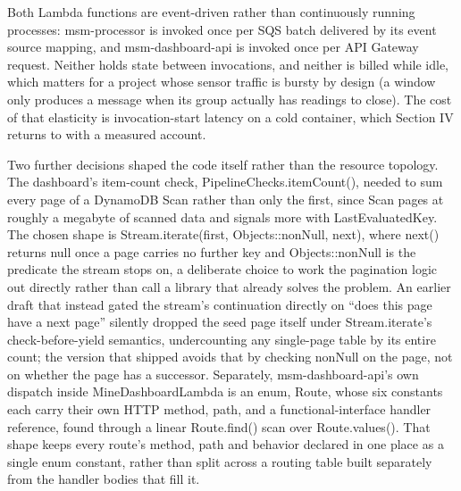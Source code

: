 \documentclass[conference]{IEEEtran}
\begin{document}
Both Lambda functions are event-driven rather than continuously running processes: msm-processor is invoked once per SQS batch delivered by its event source mapping, and msm-dashboard-api is invoked once per API Gateway request. Neither holds state between invocations, and neither is billed while idle, which matters for a project whose sensor traffic is bursty by design (a window only produces a message when its group actually has readings to close). The cost of that elasticity is invocation-start latency on a cold container, which Section IV returns to with a measured account.

Two further decisions shaped the code itself rather than the resource topology. The dashboard's item-count check, PipelineChecks.itemCount(), needed to sum every page of a DynamoDB Scan rather than only the first, since Scan pages at roughly a megabyte of scanned data and signals more with LastEvaluatedKey. The chosen shape is Stream.iterate(first, Objects::nonNull, next), where next() returns null once a page carries no further key and Objects::nonNull is the predicate the stream stops on, a deliberate choice to work the pagination logic out directly rather than call a library that already solves the problem. An earlier draft that instead gated the stream's continuation directly on ``does this page have a next page'' silently dropped the seed page itself under Stream.iterate's check-before-yield semantics, undercounting any single-page table by its entire count; the version that shipped avoids that by checking nonNull on the page, not on whether the page has a successor. Separately, msm-dashboard-api's own dispatch inside MineDashboardLambda is an enum, Route, whose six constants each carry their own HTTP method, path, and a functional-interface handler reference, found through a linear Route.find() scan over Route.values(). That shape keeps every route's method, path and behavior declared in one place as a single enum constant, rather than split across a routing table built separately from the handler bodies that fill it.
\end{document}
